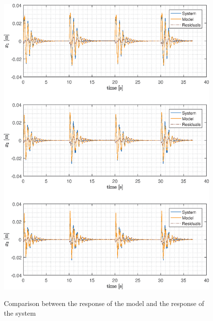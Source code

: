 \documentclass[twosided,a4paper]{article}           %
\begin{document}
\begin{figure}[H]
	\centering
		\caption{Comparison between the response of the model and the response of the system}
	\includegraphics[width=\linewidth]{img/compare_f}
	\label{fig:compare_f}
\end{figure} %
\end{document}
